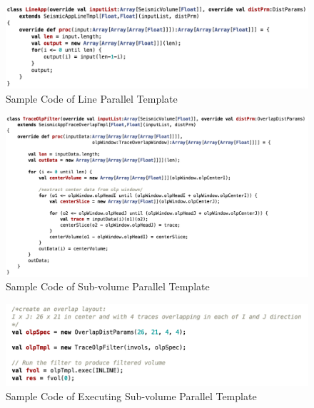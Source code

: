 \begin{figure}[h]
\centering
\includegraphics[scale=0.6]{figures/code_tmpl_line.png}
\caption{Sample Code of Line Parallel Template}
\label{code_tmpl_line}
\end{figure}

\begin{figure}[h]
\centering
\includegraphics[scale=0.5]{figures/code_tmpl_subv.png}
\caption{Sample Code of Sub-volume Parallel Template}
\label{code_tmpl_subv}
\end{figure}

\begin{figure}[h]
\centering
\includegraphics[scale=0.6]{figures/code_run_subv.png}
\caption{Sample Code of Executing Sub-volume Parallel Template}
\label{code_run_subv}
\end{figure}


